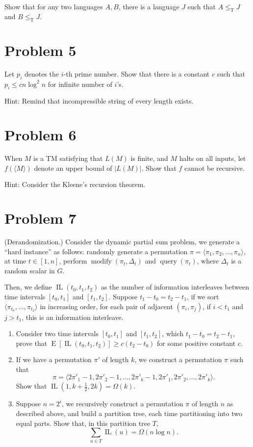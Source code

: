 \documentclass[12pt]{article}
\DeclareMathOperator{\E}{E}
\begin{document}
Show that for any two languages $A,B$, there is a language $J$ such that $A\le_{\mathrm{T}} J$ and $B\le_{\mathrm{T}} J$.

\section*{Problem 5}

Let $p_i$ denotes the $i$-th prime number. Show that there is a constant $c$ such that $p_i\le cn\log^2 n$ for infinite number of $i$'s.

Hint: Remind that incompressible string of every length exists.

\section*{Problem 6}

When $M$ is a TM satisfying that $L(M)$ is finite, and $M$ halts on all inputs, let $f(\langle M\rangle)$ denote an upper bound of $\lvert L(M)\rvert$. Show that $f$ cannot be recursive.

Hint: Consider the Kleene's recursion theorem.

\section*{Problem 7}

(Derandomization.) Consider the dynamic partial sum problem, we generate a ``hard instance'' as follows: randomly generate a permutation $\pi=\langle \pi_1,\pi_2,\dots,\pi_n\rangle$, at time $t\in [1,n]$, perform $\operatorname{modify}(\pi_t,\Delta_t)$ and $\operatorname{query}(\pi_t)$, where $\Delta_t$ is a random scalar in $G$. 

Then, we define $\operatorname{IL}(t_0,t_1,t_2)$ as the number of information interleaves between time intervals $[t_0,t_1]$ and $[t_1,t_2]$. Suppose $t_1-t_0=t_2-t_1$, if we sort $\langle \pi_{t_0},\dots,\pi_{t_2}\rangle$ in increasing order, for each pair of adjacent $(\pi_i,\pi_j)$, if $i<t_1$ and $j>t_1$, this is an information interleave.

\begin{enumerate}
	\item Consider two time intervals $[t_0,t_1]$ and $[t_1,t_2]$, which $t_1-t_0=t_2-t_1$, prove that $\E[\operatorname{IL}(t_0,t_1,t_2)]\ge c(t_2-t_0)$ for some positive constant $c$.
	\item If we have a permutation $\pi'$ of length $k$, we construct a permutation $\pi$ such that
	$$
	\pi=\langle 2\pi'_1-1,2\pi'_2-1,\dots,2\pi'_k-1,2\pi'_1,2\pi'_2,\dots,2\pi'_k\rangle.
	$$
	Show that $\operatorname{IL}(1,k+\frac{1}{2},2k)=\Omega(k)$.
	\item Suppose $n=2^i$, we recursively construct a permutation $\pi$ of length $n$ as described above, and build a partition tree, each time partitioning into two equal parts. Show that, in this partition tree $T$,
	$$
	\sum_{u\in T} \operatorname{IL}(u)=\Omega(n\log n).
	$$
\end{enumerate}
\end{document}
